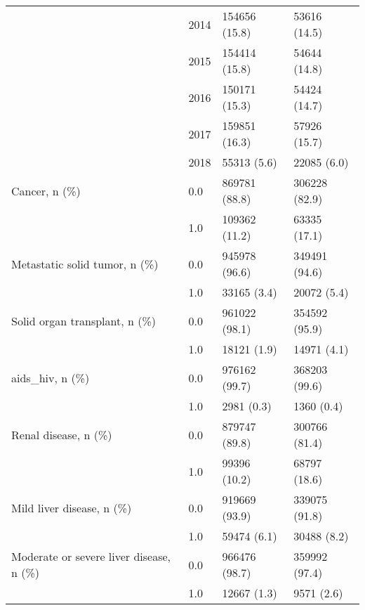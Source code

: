 \begin{tabular}{llll}
                                       & 2014 &                         154656 (15.8) &      53616 (14.5) \\
                                       & 2015 &                         154414 (15.8) &      54644 (14.8) \\
                                       & 2016 &                         150171 (15.3) &      54424 (14.7) \\
                                       & 2017 &                         159851 (16.3) &      57926 (15.7) \\
                                       & 2018 &                           55313 (5.6) &       22085 (6.0) \\
Cancer, n (\%) & 0.0 &                         869781 (88.8) &     306228 (82.9) \\
                                       & 1.0 &                         109362 (11.2) &      63335 (17.1) \\
Metastatic solid tumor, n (\%) & 0.0 &                         945978 (96.6) &     349491 (94.6) \\
                                       & 1.0 &                           33165 (3.4) &       20072 (5.4) \\
Solid organ transplant, n (\%) & 0.0 &                         961022 (98.1) &     354592 (95.9) \\
                                       & 1.0 &                           18121 (1.9) &       14971 (4.1) \\
aids\_hiv, n (\%) & 0.0 &                         976162 (99.7) &     368203 (99.6) \\
                                       & 1.0 &                            2981 (0.3) &        1360 (0.4) \\
Renal disease, n (\%) & 0.0 &                         879747 (89.8) &     300766 (81.4) \\
                                       & 1.0 &                          99396 (10.2) &      68797 (18.6) \\
Mild liver disease, n (\%) & 0.0 &                         919669 (93.9) &     339075 (91.8) \\
                                       & 1.0 &                           59474 (6.1) &       30488 (8.2) \\
Moderate or severe liver disease, n (\%) & 0.0 &                         966476 (98.7) &     359992 (97.4) \\
                                       & 1.0 &                           12667 (1.3) &        9571 (2.6) \\

\end{tabular}

